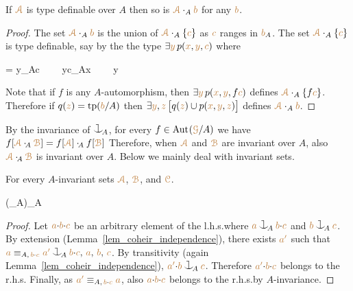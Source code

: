 \documentclass[creche.tex]{subfiles}
\begin{document}
\begin{proposition}\label{prop_typedef_Ab}
If ${\color{brown}{\EuScript A}}$ is type definable over $A$ then so is ${\color{brown}{\EuScript A}}\cdot_A{\color{brown} b}$ 
for any ${\color{brown} b}$.
\end{proposition}
\begin{proof}
The set  ${\color{brown}{\EuScript A}}\cdot_A{\color{brown} b}$ is the union of ${\color{brown}{\EuScript A}}\cdot_A\{{\color{brown} c}\}$ 
as ${\color{brown} c}$ ranges in ${\color{brown} b}_A$.
The set ${\color{brown}{\EuScript A}}\cdot_A\{{\color{brown} c}\}$ is type definable, say by the 
the type $\exists{\color{brown}y}\, p({\color{brown} x}, {\color{brown} y},{\color{brown} c})$ where

{=}
{{\mr y}\cnonfork_{\!A}{\mr c}
\ \ \wedge\ \ 
{\mr y}{\cdot}{\mr c}\equiv_A{\mr x}
\ \ \wedge\ \ 
{\mr y}\in\mrA}

Note that if $f$ is any $A$-automorphism, then 
$\exists{\color{brown}y}\, p({\color{brown} x}, {\color{brown} y},f{\color{brown} c})$ defines ${\color{brown}{\EuScript A}}\cdot_A\{f{\color{brown} c}\}$.
%
Therefore if $q({\color{brown} z})={\rm tp}({\color{brown} b}/A)$ then 
$\exists{\color{brown}y},{\color{brown} z}\, \big[q({\color{brown} z})\cup p({\color{brown} x}, {\color{brown} y},{\color{brown} z})\big]$ 
defines ${\color{brown}{\EuScript A}}\cdot_A {\color{brown} b}$.
\end{proof}

By the invariance of $\cnonfork_{\!A}$,
for every $f\in\textrm{Aut\kern.15ex}({\color{brown}\EuScript G}/A)$ we have 
$f[{\color{brown}{\EuScript A}}\cdot_{\!A}{\color{brown}\EuScript B}]=f[{\color{brown}{\EuScript A}}]\cdot_{\!A}f[{\color{brown}\EuScript B}]$
%
Therefore, when ${\color{brown}{\EuScript A}}$ and ${\color{brown}\EuScript B}$ are invariant over $A$,
also ${\color{brown}{\EuScript A}}\cdot_{\!A}{\color{brown}\EuScript B}$ is invariant over $A$.
Below we mainly deal with invariant sets.

\begin{proposition}\label{prop_semi_associative}
For every $A$-invariant sets ${\color{brown}{\EuScript A}}$, ${\color{brown}\EuScript B}$, and  ${\color{brown}\EuScript C}$.

{\subseteq}
{\big(\mrA\cdot_{\!A}\mrB\big)\cdot_{\!A}\mrC}
\end{proposition}
\begin{proof}
Let ${\color{brown} a}{\cdot}{\color{brown} b}{\cdot}{\color{brown} c}$ be an arbitrary element of the l.h.s.\@ where ${\mr a}\cnonfork_{\!A}{\mr b}{\cdot}{\mr c}$ and ${\mr b}\cnonfork_{\!A}{\mr c}$.
By extension (Lemma~\ref{lem_coheir_independence}),
there exists ${\color{brown} a'}$ such that 
${\mr a}\equiv_{A,\,{\mr b}{\cdot}{\mr c}}{\mr a'}\cnonfork_{\!A}{\mr b}{\cdot}{\mr c},\,{\mr a},\,{\mr b},\,{\mr c}$.
By transitivity (again Lemma~\ref{lem_coheir_independence}),
${\mr a'}{\cdot}{\mr b}\cnonfork_{\!A}{\mr c}$.
Therefore ${\color{brown} a'}{\cdot}{\color{brown} b}{\cdot}{\color{brown} c}$ belongs to the r.h.s.
Finally, as ${\color{brown} a'}\equiv_{A,\,{\color{brown} b}{\cdot}{\color{brown} c}}{\color{brown} a}$,
also ${\color{brown} a}{\cdot}{\color{brown} b}{\cdot}{\color{brown} c}$ belongs to the r.h.s.\@ by $A$-invariance.
\end{proof}
\end{document}
